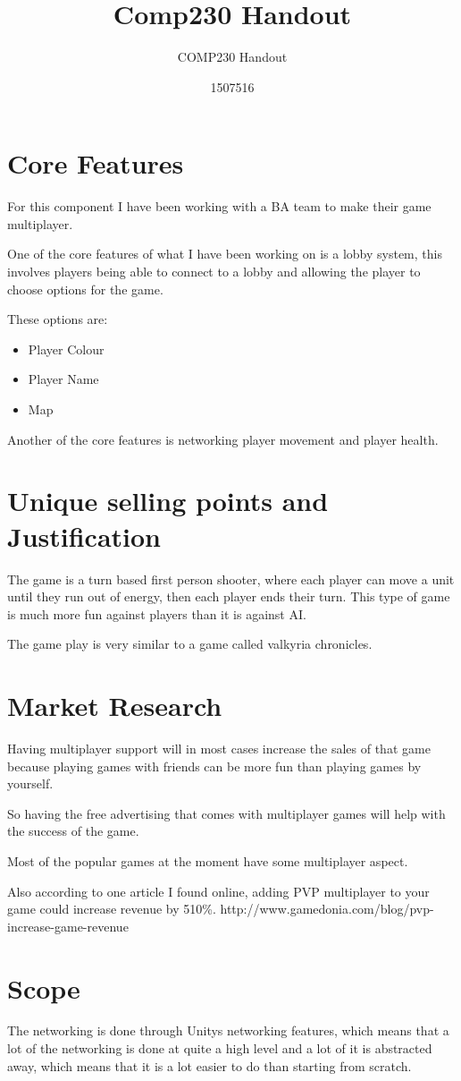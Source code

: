 \documentclass{scrartcl}
\title{Comp230 Handout}
\subtitle{COMP230 Handout}
\author{1507516}
\begin{document}
\maketitle

\abstract{}


\section{Core Features}
For this component I have been working with a BA team to make their game multiplayer.

One of the core features of what I have been working on is a lobby system, this involves players being able to connect to a lobby and allowing the player to choose options for the game.

These options are:

\begin{itemize}
\item Player Colour
\item Player Name
\item Map
\end{itemize}

Another of the core features is networking player movement and player health.

\section{Unique selling points and Justification}
The game is a turn based first person shooter, where each player can move a unit until they run out of energy, then each player ends their turn. 
This type of game is much more fun against players than it is against AI. 

The game play is very similar to a game called valkyria chronicles.

\section{Market Research}

Having  multiplayer support will in most cases increase the sales of that game because playing games with friends can be more fun than playing games by yourself.

So having the free advertising that comes with multiplayer games will help with the success of the game.

Most of the popular games at the moment have some multiplayer aspect.

Also according to one article I found online, adding PVP multiplayer to your game could increase revenue by 510\%.
http://www.gamedonia.com/blog/pvp-increase-game-revenue

\section{Scope}
The networking is done through Unitys networking features, which means that a lot of the networking is done at quite a high level and a lot of it is abstracted away, which means that it is a lot easier to do than starting from scratch. 
\end{document}
